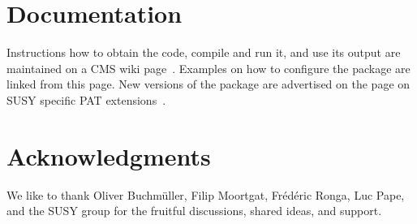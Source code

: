 \documentclass{cmspaper}
\begin{document}
\clearpage


\section{Documentation}
Instructions how to obtain the code, compile and run it, and use its
output are maintained on a CMS wiki page~\cite{twiki}. Examples on how to
configure the package are linked from this page. New versions of the package
are advertised on the page on SUSY specific PAT extensions~\cite{susypat}.


\section{Acknowledgments}
We like to thank Oliver Buchm\"uller, Filip Moortgat, Fr\'ed\'eric Ronga,  Luc
Pape, and the SUSY group for the fruitful discussions, shared ideas, and
support.

%

\end{document}
